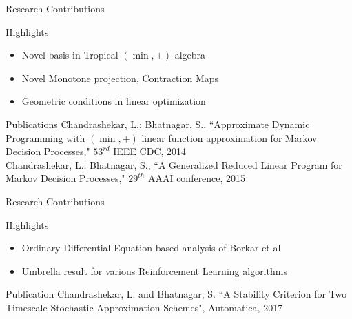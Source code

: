 \documentclass[10pt,handout]{beamer}
\begin{document}
\begin{frame}[fragile]{Research Contributions}
\textbf{\color{orange}{Developed ADP methods with provable performance guarantees}}
\begin{block}{Highlights}
\begin{itemize}
\item Novel basis in Tropical $(\min,+)$ algebra
\item Novel Monotone projection, Contraction Maps
\item Geometric conditions in linear optimization
\end{itemize}
\end{block}

\begin{block}{Publications}
Chandrashekar, L.; Bhatnagar, S., ``Approximate Dynamic Programming with $(\min,+)$ linear function approximation for Markov Decision Processes," $53^{rd}$ IEEE CDC, 2014\\
Chandrashekar, L.; Bhatnagar, S., ``A Generalized Reduced Linear Program for Markov Decision Processes," $29^{th}$ AAAI conference, 2015
\end{block}

\end{frame}
\begin{frame}[fragile]{Research Contributions}
\textbf{\color{orange}{Provided conditions that imply stability of multi-timescale stochastic approximation algorithms}}
\begin{block}{Highlights}
\begin{itemize}
\item Ordinary Differential Equation based analysis of Borkar et al
\item Umbrella result for various Reinforcement Learning algorithms
\end{itemize}
\end{block}

\begin{block}{Publication}
Chandrashekar, L. and  Bhatnagar, S. ``A Stability Criterion for Two Timescale Stochastic Approximation Schemes",  Automatica, 2017
\end{block}
\end{frame}
\end{document}
